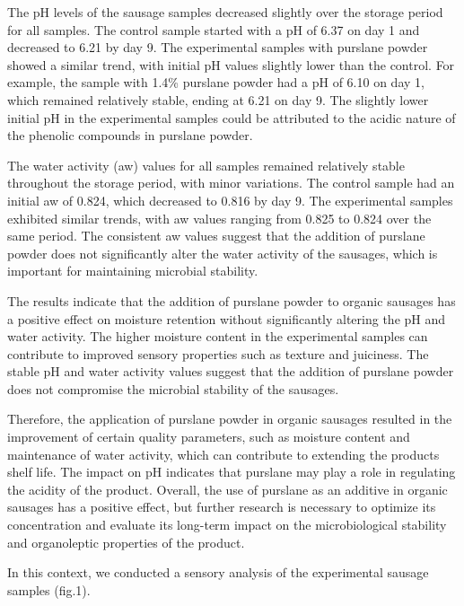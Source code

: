 The pH levels of the sausage samples decreased slightly over the storage
period for all samples. The control sample started with a pH of 6.37 on
day 1 and decreased to 6.21 by day 9. The experimental samples with
purslane powder showed a similar trend, with initial pH values slightly
lower than the control. For example, the sample with 1.4\% purslane
powder had a pH of 6.10 on day 1, which remained relatively stable,
ending at 6.21 on day 9. The slightly lower initial pH in the
experimental samples could be attributed to the acidic nature of the
phenolic compounds in purslane powder.

The water activity (aw) values for all samples remained relatively
stable throughout the storage period, with minor variations. The control
sample had an initial aw of 0.824, which decreased to 0.816 by day 9.
The experimental samples exhibited similar trends, with aw values
ranging from 0.825 to 0.824 over the same period. The consistent aw
values suggest that the addition of purslane powder does not
significantly alter the water activity of the sausages, which is
important for maintaining microbial stability.

The results indicate that the addition of purslane powder to organic
sausages has a positive effect on moisture retention without
significantly altering the pH and water activity. The higher moisture
content in the experimental samples can contribute to improved sensory
properties such as texture and juiciness. The stable pH and water
activity values suggest that the addition of purslane powder does not
compromise the microbial stability of the sausages.

Therefore, the application of purslane powder in organic sausages
resulted in the improvement of certain quality parameters, such as
moisture content and maintenance of water activity, which can contribute
to extending the product\textquotesingle s shelf life. The impact on pH
indicates that purslane may play a role in regulating the acidity of the
product. Overall, the use of purslane as an additive in organic sausages
has a positive effect, but further research is necessary to optimize its
concentration and evaluate its long-term impact on the microbiological
stability and organoleptic properties of the product.

In this context, we conducted a sensory analysis of the experimental
sausage samples (fig.1).

